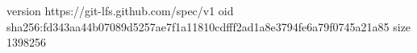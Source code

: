 version https://git-lfs.github.com/spec/v1
oid sha256:fd343aa44b07089d5257ae7f1a11810cdfff2ad1a8e3794fe6a79f0745a21a85
size 1398256
